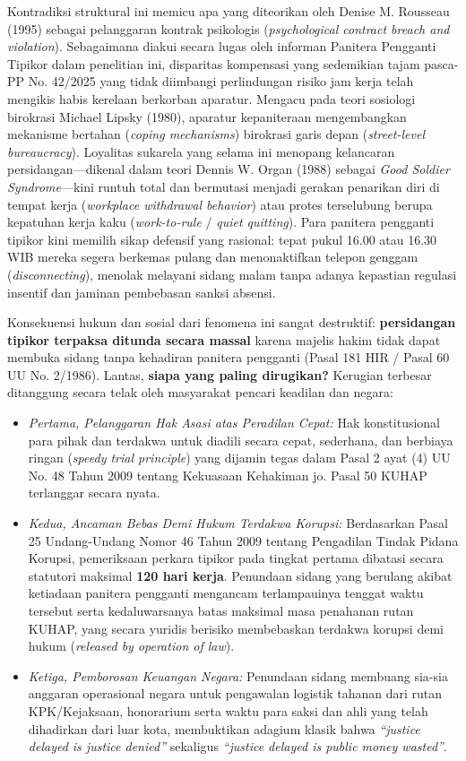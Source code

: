 \documentclass[12pt, a4paper]{article}
\begin{document}
Kontradiksi struktural ini memicu apa yang diteorikan oleh Denise M. Rousseau (1995) sebagai pelanggaran kontrak psikologis (\textit{psychological contract breach and violation}). Sebagaimana diakui secara lugas oleh informan Panitera Pengganti Tipikor dalam penelitian ini, disparitas kompensasi yang sedemikian tajam pasca-PP No. 42/2025 yang tidak diimbangi perlindungan risiko jam kerja telah mengikis habis kerelaan berkorban aparatur. Mengacu pada teori sosiologi birokrasi Michael Lipsky (1980), aparatur kepaniteraan mengembangkan mekanisme bertahan (\textit{coping mechanisms}) birokrasi garis depan (\textit{street-level bureaucracy}). Loyalitas sukarela yang selama ini menopang kelancaran persidangan---dikenal dalam teori Dennis W. Organ (1988) sebagai \textit{Good Soldier Syndrome}---kini runtuh total dan bermutasi menjadi gerakan penarikan diri di tempat kerja (\textit{workplace withdrawal behavior}) atau protes terselubung berupa kepatuhan kerja kaku (\textit{work-to-rule} / \textit{quiet quitting}). Para panitera pengganti tipikor kini memilih sikap defensif yang rasional: tepat pukul 16.00 atau 16.30 WIB mereka segera berkemas pulang dan menonaktifkan telepon genggam (\textit{disconnecting}), menolak melayani sidang malam tanpa adanya kepastian regulasi insentif dan jaminan pembebasan sanksi absensi.

Konsekuensi hukum dan sosial dari fenomena ini sangat destruktif: \textbf{persidangan tipikor terpaksa ditunda secara massal} karena majelis hakim tidak dapat membuka sidang tanpa kehadiran panitera pengganti (Pasal 181 HIR / Pasal 60 UU No. 2/1986). Lantas, \textbf{siapa yang paling dirugikan?} Kerugian terbesar ditanggung secara telak oleh masyarakat pencari keadilan dan negara:
\begin{itemize}
    \item \textit{Pertama, Pelanggaran Hak Asasi atas Peradilan Cepat:} Hak konstitusional para pihak dan terdakwa untuk diadili secara cepat, sederhana, dan berbiaya ringan (\textit{speedy trial principle}) yang dijamin tegas dalam Pasal 2 ayat (4) UU No. 48 Tahun 2009 tentang Kekuasaan Kehakiman jo. Pasal 50 KUHAP terlanggar secara nyata.
    \item \textit{Kedua, Ancaman Bebas Demi Hukum Terdakwa Korupsi:} Berdasarkan Pasal 25 Undang-Undang Nomor 46 Tahun 2009 tentang Pengadilan Tindak Pidana Korupsi, pemeriksaan perkara tipikor pada tingkat pertama dibatasi secara statutori maksimal \textbf{120 hari kerja}. Penundaan sidang yang berulang akibat ketiadaan panitera pengganti mengancam terlampauinya tenggat waktu tersebut serta kedaluwarsanya batas maksimal masa penahanan rutan KUHAP, yang secara yuridis berisiko membebaskan terdakwa korupsi demi hukum (\textit{released by operation of law}).
    \item \textit{Ketiga, Pemborosan Keuangan Negara:} Penundaan sidang membuang sia-sia anggaran operasional negara untuk pengawalan logistik tahanan dari rutan KPK/Kejaksaan, honorarium serta waktu para saksi dan ahli yang telah dihadirkan dari luar kota, membuktikan adagium klasik bahwa \textit{``justice delayed is justice denied''} sekaligus \textit{``justice delayed is public money wasted''}.
\end{itemize}
\end{document}
